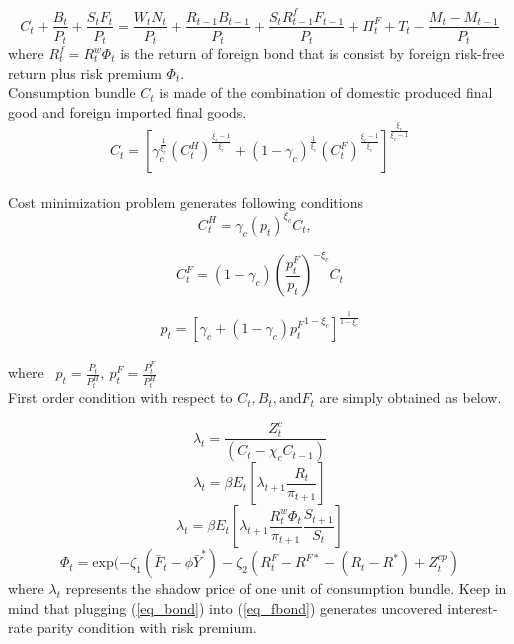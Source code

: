 \documentclass[11pt, a4paper]{article}
\begin{document}
 \begin{displaymath}  C_t  + \frac{B_t}{P_t} + \frac{S_t F_t}{P_t}= \frac{ W_t N_t} {P_t} +  \frac{R_{t-1}B_{t-1}} {P_t} + \frac{S_t R_{t-1}^f F_{t-1}} {P_t} + \Pi_t^F + T_t - \frac{M_t - M_{t-1}}{P_t} \end{displaymath} where $R_t^f = R_t^w \Phi_t $ is the return of foreign bond that is consist by foreign risk-free return plus risk premium $\Phi_t$. \\

Consumption bundle $C_t$ is made of the combination of domestic produced final good and foreign imported final goods.
\[C_t = \left[\gamma_c ^{\frac{1}{\xi_c}} (C_t^H )^{\frac{\xi_c -1}{\xi_c}} +(1-\gamma_c) ^{\frac{1}{\xi_c}} (C_t^F )^{\frac{\xi_c -1}{\xi_c}}  \right]^{\frac{\xi_c}{\xi_c -1}} \] \\
Cost minimization problem generates following conditions \\
\begin{equation}
C_t^H = \gamma_c \left(p_t  \right) ^{\xi_c} C_t,~~~
\end{equation}

\begin{equation}C_t^F = (1-\gamma_c ) \left(\frac{p_t^F}{p_t}  \right) ^{-\xi_c} C_t \end{equation}

\begin{equation}p_t = \left[ \gamma_c +(1-\gamma_c) {p_t^F}^{{1-\xi_c}}  \right]  ^{\frac{1}{1-\xi_c}} \end{equation} \\
where ~$p_t = \frac{P_t} {P_t^H},~p_t^F = \frac{P_t^F} {P_t^H}$ \\

 First order condition with respect to $C_t, B_t, \text{and} F_t$ are simply obtained as below. 

\begin{equation}
\lambda_t = \frac{Z_t^c}{(C_t - \chi_c C_{t-1})}
\end{equation}
\begin{equation}
\lambda_t = \beta E_t \left[ \lambda_{t+1} \frac{R_t}{\pi_{t+1}} \right]
\label{eq_bond}\end{equation}
\begin{equation}
\lambda_t = \beta E_t \left[ \lambda_{t+1} \frac{R_t^w \Phi_t}{\pi_{t+1}} \frac{S_{t+1}}{S_t} \right]
\label{eq_fbond}\end{equation}
\[ \Phi_t = \text{exp} (-\zeta_1 (\bar{F}_t - \phi \bar{Y}^*)  - \zeta_2 (R_t^F - R^{F*} - (R_t - R^*)  + Z_t^{cp}  ) \]
where $\lambda_t$ represents the shadow price of one unit of consumption bundle. 
Keep in mind that  plugging (\ref{eq_bond}) into (\ref{eq_fbond}) generates uncovered interest-rate parity condition with risk premium. \\
\end{document}
